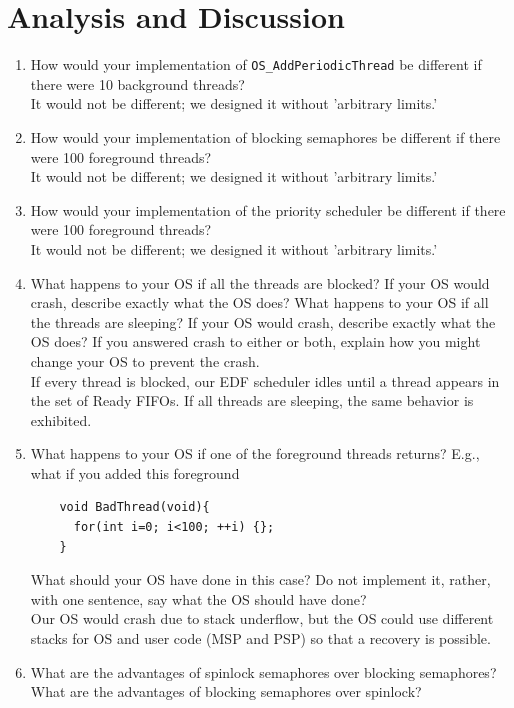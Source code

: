 \documentclass[12pt]{article}
\begin{document}
\section{Analysis and Discussion}

\begin{enumerate}[1)]
\item How would your implementation of \verb|OS_AddPeriodicThread| be
  different if there were 10 background threads? \\

  It would not be different; we designed it without 'arbitrary limits.'
\item How would your implementation of blocking semaphores be
  different if there were 100 foreground threads? \\

  It would not be different; we designed it without 'arbitrary limits.'
\item How would your implementation of the priority scheduler be
  different if there were 100 foreground threads? \\

  It would not be different; we designed it without 'arbitrary limits.'
\item What happens to your OS if all the threads are blocked? If your
  OS would crash, describe exactly what the OS does? What happens to
  your OS if all the threads are sleeping? If your OS would crash,
  describe exactly what the OS does? If you answered crash to either
  or both, explain how you might change your OS to prevent the crash. \\

  If every thread is blocked, our EDF scheduler idles until a thread
  appears in the set of Ready FIFOs. If all threads are sleeping, the
  same behavior is exhibited.
\item What happens to your OS if one of the foreground threads
  returns? E.g., what if you added this foreground
  \begin{verbatim}
    void BadThread(void){
      for(int i=0; i<100; ++i) {};
    }
  \end{verbatim}
  What should your OS have done in this case? Do not implement it,
  rather, with one sentence, say what the OS should have done? \\

  Our OS would crash due to stack underflow, but the OS could use
  different stacks for OS and user code (MSP and PSP) so that a
  recovery is possible.
\item What are the advantages of spinlock semaphores over blocking
  semaphores? What are the advantages of blocking semaphores over
  spinlock? \\


\end{enumerate}
\end{document}
